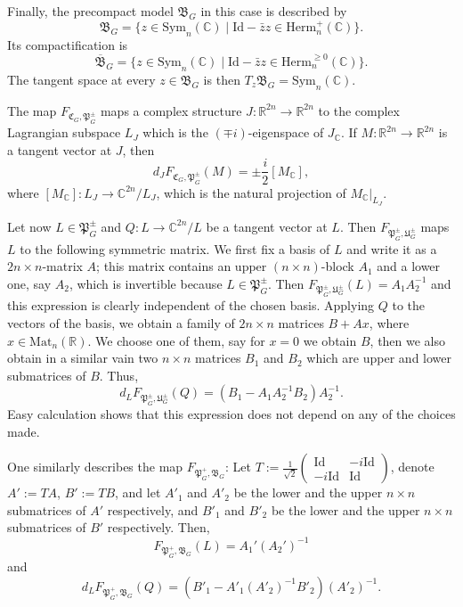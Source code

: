 \documentclass[oneside,11pt]{amsart}
\theoremstyle{definition}
\theoremstyle{remark}
\numberwithin{thm}{section}
\numberwithin{equation}{section}
\begin{document}
    Finally, the precompact model $\mathfrak{B}_G$ in this case is described by
    $$\mathfrak{B}_G=\{z\in\mathrm{Sym}_n(\mathbb C)\mid \mathrm{Id}-\bar zz\in\mathrm{Herm}^+_n(\mathbb C)\}.$$
    Its compactification is 
    $$\overline{\mathfrak{B}}_G=\{z\in\mathrm{Sym}_n(\mathbb C)\mid \mathrm{Id}-\bar zz\in\mathrm{Herm}^{\geq 0}_n(\mathbb C)\}.$$
    The tangent space at every $z\in\mathfrak B_G$ is then $T_z\mathfrak B_G=\mathrm{Sym}_n(\mathbb C)$.
    
    The map $F_{\mathfrak{C}_G,\mathfrak{P}_G^\pm}$ maps a complex structure $J\colon \mathbb R^{2n}\to \mathbb R^{2n}$ to the complex Lagrangian subspace $L_J$ which is the $(\mp i)$-eigenspace of $J_\mathbb C$. If $M\colon \mathbb R^{2n}\to \mathbb R^{2n}$ is a tangent vector at $J$, then 
    \[d_JF_{\mathfrak{C}_G,\mathfrak{P}_G^\pm}(M)=\pm\frac{i}{2}[M_\mathbb C],\] 
    where $[M_\mathbb C]\colon L_J\to \mathbb C^{2n}/L_J$, which is the natural projection of $M_\mathbb C|_{L_J}$.

    Let now $L\in\mathfrak{P}_G^\pm$ and $Q\colon L\to \mathbb C^{2n}/L$ be a tangent vector at $L$. Then $F_{\mathfrak{P}_G^\pm,\mathfrak U_G^\pm}$ maps $L$ to the following symmetric matrix. We first fix a basis of $L$ and write it as a $2n\times n$-matrix $A$; this matrix contains an upper $(n\times n)$-block $A_1$ and a lower one, say $A_2$, which is invertible because $L\in\mathfrak{P}_G^\pm$. Then $F_{\mathfrak{P}_G^\pm,\mathfrak U_G^\pm}(L)=A_1A_2^{-1}$ and this expression is clearly independent of the chosen basis. Applying $Q$ to the vectors of the basis, we obtain a family of $2n\times n$ matrices $B+Ax$, where $x\in\mathrm{Mat}_n(\mathbb R)$. We choose one of them, say for $x=0$ we obtain $B$, then we also obtain in a similar vain two $n\times n$ matrices $B_1$ and $B_2$ which are upper and lower submatrices of $B$. Thus, 
    \[d_LF_{\mathfrak{P}_G^\pm,\mathfrak U_G^\pm}(Q)=(B_1-A_1A_2^{-1}B_2)A_2^{-1}.\] Easy calculation shows that this expression does not depend on any of the choices made.

    One similarly describes the map $F_{\mathfrak{P}_G^+,\mathfrak{B}_G}$: Let $T:=\frac{1}{\sqrt{2}}\begin{pmatrix}
    \mathrm{Id} & -i\mathrm{Id}\\
    -i\mathrm{Id} & \mathrm{Id}
    \end{pmatrix}$, denote $A':=TA$, $B':=TB$, and let $A'_1$ and $A'_2$ be the lower and the upper $n\times n$ submatrices of $A'$ respectively, and $B'_1$ and $B'_2$ be the lower and the upper $n\times n$ submatrices of $B'$ respectively. Then, 
    \[F_{\mathfrak{P}_G^+,\mathfrak{B}_G}(L)=A_1'(A_2')^{-1}\] 
    and \[d_LF_{\mathfrak{P}_G^+,\mathfrak B_G}(Q)=(B'_1-A'_1(A'_2)^{-1}B'_2)(A'_2)^{-1}.\]
\end{document}
